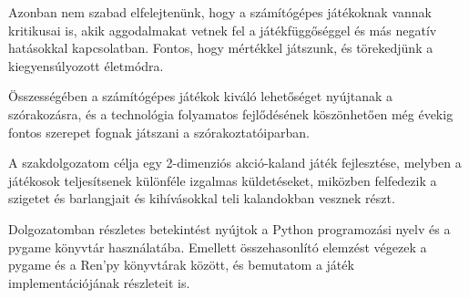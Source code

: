 Azonban nem szabad elfelejtenünk, hogy a számítógépes játékoknak vannak kritikusai is, akik aggodalmakat vetnek fel a játékfüggőséggel és más negatív hatásokkal kapcsolatban. Fontos, hogy mértékkel játszunk, és törekedjünk a kiegyensúlyozott életmódra.

Összességében a számítógépes játékok kiváló lehetőséget nyújtanak a szórakozásra, és a technológia folyamatos fejlődésének köszönhetően még évekig fontos szerepet fognak játszani a szórakoztatóiparban.

A szakdolgozatom célja egy 2-dimenziós akció-kaland játék fejlesztése, melyben a játékosok teljesítsenek különféle izgalmas küldetéseket, miközben felfedezik a szigetet és barlangjait és kihívásokkal teli kalandokban vesznek részt.

Dolgozatomban részletes betekintést nyújtok a Python programozási nyelv és a pygame könyvtár használatába. Emellett összehasonlító elemzést végezek a pygame és a Ren'py könyvtárak között, és bemutatom a játék implementációjának részleteit is.